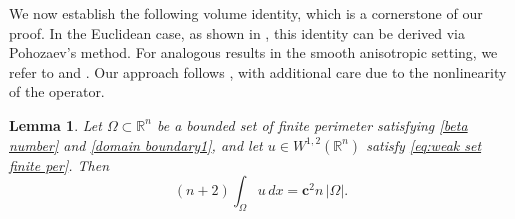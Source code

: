 \documentclass[reqno,11pt]{amsart}
\makeatletter
\newtheorem{lem}[thm]{Lemma}%
\numberwithin{equation}{section}
\theoremstyle{remark}
\makeatother
\begin{document}
We now establish the following volume identity, which is a cornerstone of our proof. In the Euclidean case, as shown in
\cite{W1971}, this identity can be derived via Pohozaev's method. For analogous results in the smooth anisotropic setting, we refer to
\cite[Lemma~4.2]{CS2009} and \cite[Theorem~5]{WX2011}. Our approach follows \cite[Lemma~2.2]{FZ2025}, with additional care due to
the nonlinearity of the operator.


\begin{lem}\label{lem:volume}
Let $\Omega\subset \mathbb R^n$ be a bounded set of finite perimeter satisfying {\eqref{beta number} and} \eqref{domain boundary1},
and let $u \in W^{1,2}(\mathbb R^n)$ satisfy \eqref{eq:weak set finite per}. Then
\begin{equation}\label{volume}
(n+2)\int_{\Omega}u\,dx =  {\mathbf{c}^2 n}\, |\Omega|.
\end{equation}
\end{lem}
\end{document}
